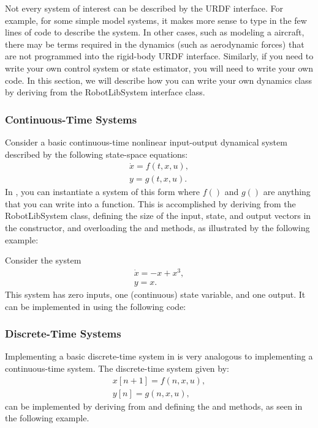 Not every system of interest can be described by the URDF interface.  For example, for some simple model systems, it makes more sense to type in the few lines of \matlab code to describe the system.  In other cases, such as modeling a aircraft, there may be terms required in the dynamics (such as aerodynamic forces) that are not programmed into the rigid-body URDF interface.  Similarly, if you need to write your own control system or state estimator, you will need to write your own code.   In this section, we will describe how you can write your own dynamics class by deriving from the RobotLibSystem interface class. 

\subsubsection{Continuous-Time Systems}

Consider a basic continuous-time nonlinear input-output dynamical system described by the following state-space equations:
\begin{gather*}
\dot{x} = f(t,x,u), \\ y = g(t,x,u).
\end{gather*}
In \robotlib, you can instantiate a system of this form where $f()$ and $g()$ are anything that you can write into a \matlab function.  This is accomplished by deriving from the RobotLibSystem class, defining the size of the input, state, and output vectors in the constructor, and overloading the  and  methods, as illustrated by the following example:

\begin{example}
Consider the system \begin{gather*}\dot{x} = -x + x^3,\\ y = x.\end{gather*}  This system has zero inputs, one (continuous) state variable, and one output.  It can be implemented in \robotlib using the following code:

\end{example}


\subsubsection{Discrete-Time Systems}

Implementing a basic discrete-time system in \robotlib is very analogous to implementing a continuous-time system.  The discrete-time system given by:
\begin{gather*}
x[n+1] = f(n,x,u),\\
y[n] = g(n,x,u),
\end{gather*}
can be implemented by deriving from  and defining the  and  methods, as seen in the following example.  

